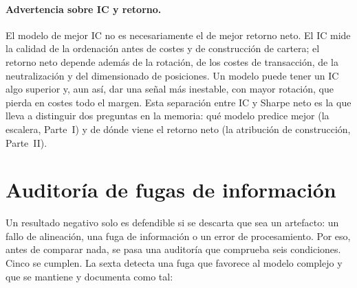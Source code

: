 \paragraph{Advertencia sobre IC y retorno.} El modelo de mejor IC no es necesariamente el
de mejor retorno neto. El IC mide la calidad de la ordenación antes de costes y de
construcción de cartera; el retorno neto depende además de la rotación, de los costes de
transacción, de la neutralización y del dimensionado de posiciones. Un modelo puede tener
un IC algo superior y, aun así, dar una señal más inestable, con mayor rotación, que
pierda en costes todo el margen. Esta separación entre IC y Sharpe neto es la que lleva a
distinguir dos preguntas en la memoria: qué modelo predice mejor (la escalera, Parte~I) y
de dónde viene el retorno neto (la atribución de construcción, Parte~II).

\section{Auditoría de fugas de información}\label{sec:met-leakage}

Un resultado negativo solo es defendible si se descarta que sea un artefacto: un fallo de
alineación, una fuga de información o un error de procesamiento. Por eso, antes de
comparar nada, se pasa una auditoría que comprueba seis condiciones. Cinco se cumplen. La
sexta detecta una fuga que favorece al modelo complejo y que se mantiene y documenta como
tal:

